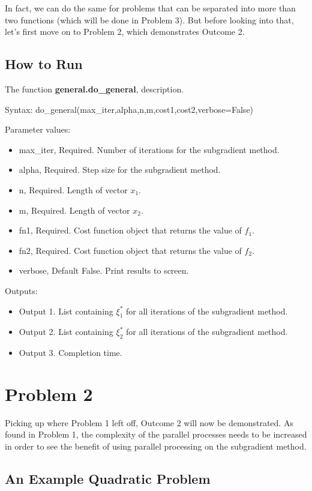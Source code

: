 \documentclass[12pt]{article}
\begin{document}
In fact, we can do the same for problems that can be separated into more than two functions (which will be done in Problem 3). But before looking into that, let's first move on to Problem 2, which demonstrates Outcome 2.

\subsection*{How to Run}

\noindent The function \textbf{general.do\_general}, description.

Syntax: do\_general(max\_iter,alpha,n,m,cost1,cost2,verbose=False)

Parameter values:
\begin{itemize}
	\item max\_iter, Required. Number of iterations for the subgradient method.
	\item alpha, Required. Step size for the subgradient method.
	\item n, Required. Length of vector $x_1$.
	\item m, Required. Length of vector $x_2$.
	\item fn1, Required. Cost function object that returns the value of $f_1$.
	\item fn2, Required. Cost function object that returns the value of $f_2$. 
	\item verbose, Default False. Print results to screen.
\end{itemize}

Outputs:
\begin{itemize}
	\item Output 1. List containing $\xi_1^*$ for all iterations of the subgradient method.
	\item Output 2. List containing $\xi_2^*$ for all iterations of the subgradient method.
	\item Output 3. Completion time.
\end{itemize}


\section*{Problem 2}

Picking up where Problem 1 left off, Outcome 2 will now be demonstrated. As found in Problem 1, the complexity of the parallel processes needs to be increased in order to see the benefit of using parallel processing on the subgradient method.

\subsection*{An Example Quadratic Problem}
\end{document}
